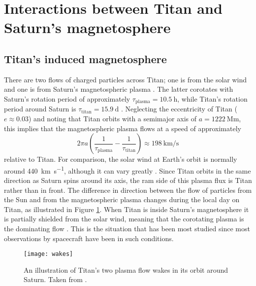 \documentclass[12pt, parskip=full*, abstract]{scrartcl}
\begin{document}
\section{Interactions between Titan and Saturn's magnetosphere}

\subsection{Titan's induced magnetosphere}\label{s:induced-magnetosphere}
There are two flows of charged particles across Titan; one is from the solar wind and one is from Saturn's magnetospheric plasma \parencite{ionosphere-magnetosphere-interaction-coates}. The latter corotates with Saturn's rotation period of approximately $\tau_\text{plasma}=\SI{10.5}{\hour}$, while Titan's rotation period around Saturn is $\tau_\text{titan}=\SI{15.9}{\day}$ \parencite{fundamental-planetary-science}. Neglecting the eccentricity of Titan ($e\approx0.03$) and noting that Titan orbits with a semimajor axis of $a=\SI{1222}{\mega\metre}$, this implies that the magnetospheric plasma flows at a speed of approximately
\begin{equation}
	2\pi a\left(\frac{1}{\tau_\text{plasma}} - \frac{1}{\tau_\text{titan}}\right)\approx\SI{198}{\kilo\metre\per\second}
\end{equation}
relative to Titan. For comparison, the solar wind at Earth's orbit is normally around \SI{440}{\kilo\metre\per\second}, although it can vary greatly \parencite{encyclopedia-solar-wind}. Since Titan orbits in the same direction as Saturn spins around its axis, the ram side of this plasma flux is  Titan rather than in front. The difference in direction between the flow of particles from the Sun and from the magnetospheric plasma changes during the local day on Titan, as illustrated in Figure \ref{fig:wakes}. When Titan is inside Saturn's magnetosphere it is partially shielded from the solar wind, meaning that the corotating plasma is the dominating flow \parencite{ionosphere-magnetosphere-interaction-coates}. This is the situation that has been most studied since most observations by spacecraft have been in such conditions.

\begin{figure}[htbp]
	\centering
	\texttt{[image: wakes]}
	\caption{An illustration of Titan's two plasma flow wakes in its orbit around Saturn. Taken from \textcite{ionosphere-magnetosphere-interaction-coates}.}
	\label{fig:wakes}
\end{figure}
\end{document}
